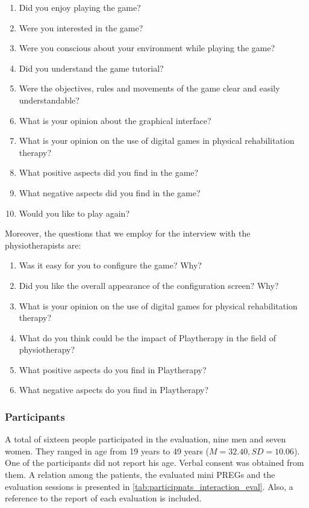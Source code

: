 \begin{enumerate}
    \item Did you enjoy playing the game?
    \item Were you interested in the game?
    \item Were you conscious about your environment while playing the game?
    \item Did you understand the game tutorial?
    \item Were the objectives, rules and movements of the game clear and easily understandable?
    \item What is your opinion about the graphical interface?
    \item What is your opinion on the use of digital games in physical rehabilitation therapy?
    \item What positive aspects did you find in the game?
    \item What negative aspects did you find in the game?
    \item Would you like to play again?
\end{enumerate}

Moreover, the questions that we employ for the interview with the physiotherapists are: 

\begin{enumerate}
    \item Was it easy for you to configure the game? Why?
    \item Did you like the overall appearance of the configuration screen? Why?
    \item What is your opinion on the use of digital games for physical rehabilitation therapy?
    \item What do you think could be the impact of Playtherapy in the field of physiotherapy?
    \item What positive aspects do you find in Playtherapy?
    \item What negative aspects do you find in Playtherapy?
\end{enumerate}

\subsubsection{Participants}
\label{sec:eval_int_eff_participants}

A total of sixteen people participated in the evaluation, nine men and seven women. They ranged in age from 19 years to 49 years ($M = 32.40, SD = 10.06$). One of the participants did not report his age. Verbal consent was obtained from them. A relation among the patients, the evaluated mini \acp{PREG} and the evaluation sessions is presented in \autoref{tab:participnats_interaction_eval}. Also, a reference to the report of each evaluation is included.

